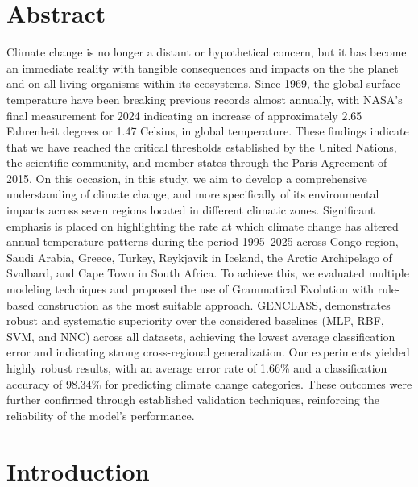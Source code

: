 \documentclass[12pt]{Definitions/academia}
\begin{document}
\section*{Abstract}
Climate change is no longer a distant or hypothetical concern, but
it has become an immediate reality with tangible consequences and
impacts on the the planet and on all living organisms within its ecosystems.
Since 1969, the global surface temperature have been breaking previous
records almost annually, with NASA\textquoteright s final measurement
for 2024 indicating an increase of approximately 2.65  Fahrenheit degrees
or 1.47 Celsius, in global temperature. These findings indicate that
we have reached the critical thresholds established by the United
Nations, the scientific community, and member states through the Paris
Agreement of 2015. On this occasion, in this study, we aim to develop
a comprehensive understanding of climate change, and more specifically
of its environmental impacts across seven regions located in different
climatic zones. Significant emphasis is placed on highlighting the
rate at which climate change has altered annual temperature patterns
during the period 1995--2025 across Congo region, Saudi Arabia, Greece,
Turkey, Reykjavik in Iceland, the Arctic Archipelago of Svalbard,
and Cape Town in South Africa. To achieve this, we evaluated multiple
modeling techniques and proposed the use of Grammatical Evolution
with rule-based construction as the most suitable approach. GENCLASS,
demonstrates robust and systematic superiority over the considered
baselines (MLP, RBF, SVM, and NNC) across all datasets, achieving
the lowest average classification error and indicating strong cross-regional
generalization. Our experiments yielded highly robust results, with
an average error rate of 1.66\% and a classification accuracy of 98.34\%
for predicting climate change categories. These outcomes were further
confirmed through established validation techniques, reinforcing the
reliability of the model\textquoteright s performance.


\section{Introduction}\label{sec1}
\end{document}
